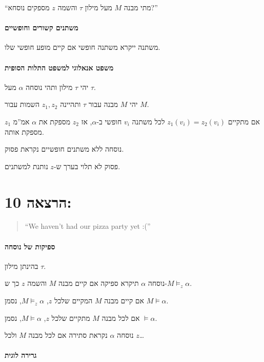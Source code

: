 \documentclass[12pt,a4paper]{article}
\begin{document}
``מתי מבנה $M$ מעל מילון $\tau$ והשמה $z$ מספקים נוסחא?''

\subsection*{משתנים קשורים וחופשיים}

משתנה ייקרא משתנה חופשי אם קיים מופע חופשי שלו.

\subsection*{משפט אנאלוגי למשפט התלות הסופית}

יהי $\tau$ מילון ותהי נוסחה $\alpha$ מעל $\tau$.

יהי $M$ מבנה עבור $\tau$ ותהיינה $z_{1},z_{2}$ השמות עבור $M$.

אם מתקיים $z_{1}(v_{i})=z_{2}(v_{i})$ לכל משתנה $v_{i}$ חופשי ב-$\alpha$, אז $z_{2}$ מספקת את $\alpha$ אמ''מ $z_{1}$ מספקת אותה.

נוסחה ללא משתנים חופשיים נקראת פסוק.

פסוק לא תלוי בערך ש-$z$ נותנת למשתנים.

\part*{הרצאה 10:}

\begin{quote}
\textenglish{``We haven't had our pizza party yet :(''}
\end{quote}

\subsection*{ספיקות של נוסחה}

בהינתן מילון $\tau$.

נוסחה $\alpha$ תיקרא ספיקה אם קיים מבנה $M$ והשמה $z$ כך ש-$M\vDash_{z}\alpha$.

אם קיים מבנה $M$ המקיים שלכל $z$, $M\vDash_{z}\alpha$, נסמן $M\vDash\alpha$.

אם לכל מבנה $M$ מתקיים שלכל $z$, $M\vDash\alpha$, נסמן $\vDash\alpha$.

נוסחה $\alpha$ נקראת סתירה אם לכל מבנה $M$ ולכל $z$\ldots

\subsection*{גרירה לוגית}
\end{document}
